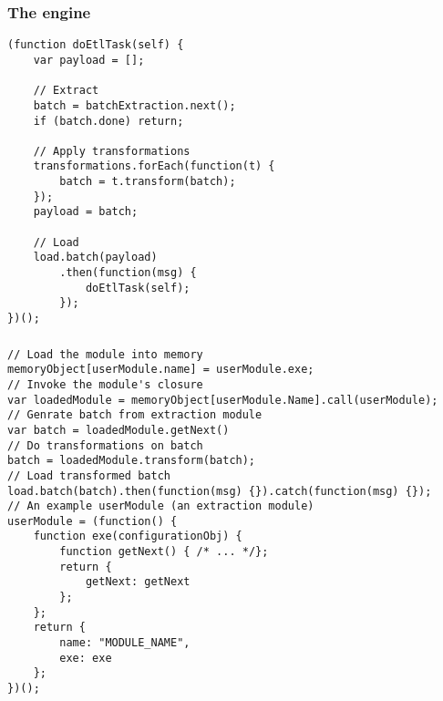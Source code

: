 \subsubsection{The engine}
\label{appendix:netl-engine}
\begin{verbatim}
(function doEtlTask(self) {
    var payload = [];

    // Extract
    batch = batchExtraction.next();
    if (batch.done) return;

    // Apply transformations
    transformations.forEach(function(t) {
        batch = t.transform(batch);
    });
    payload = batch;

    // Load
    load.batch(payload)
        .then(function(msg) {
            doEtlTask(self);
        });
})();
\end{verbatim}

\subsubsection{}
\label{appendix:netl-loading}
\begin{verbatim}
// Load the module into memory
memoryObject[userModule.name] = userModule.exe;
// Invoke the module's closure
var loadedModule = memoryObject[userModule.Name].call(userModule);
// Genrate batch from extraction module
var batch = loadedModule.getNext()
// Do transformations on batch
batch = loadedModule.transform(batch);
// Load transformed batch
load.batch(batch).then(function(msg) {}).catch(function(msg) {});
// An example userModule (an extraction module)
userModule = (function() {
    function exe(configurationObj) {
        function getNext() { /* ... */};
        return {
            getNext: getNext
        };
    };
    return {
        name: "MODULE_NAME",
        exe: exe
    };
})();
\end{verbatim}